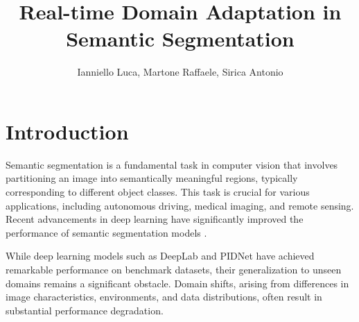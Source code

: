 \documentclass[10pt,twocolumn,letterpaper]{article}
\begin{document}
\title{Real-time Domain Adaptation in Semantic Segmentation}

\author{Ianniello Luca, 
Martone Raffaele,
Sirica Antonio\\}




\section{Introduction}
\label{sec:intro}

Semantic segmentation is a fundamental task in computer vision that involves partitioning an image into semantically meaningful regions, typically corresponding to different object classes. This task is crucial for various applications, including autonomous driving, medical imaging, and remote sensing. Recent advancements in deep learning have significantly improved the performance of semantic segmentation models \cite{hao2020brief}. 

While deep learning models such as DeepLab \cite{chen2017deeplab} and PIDNet \cite{feng2021pidnet} have achieved remarkable performance on benchmark datasets, their generalization to unseen domains remains a significant obstacle. Domain shifts, arising from differences in image characteristics, environments, and data distributions, often result in substantial performance degradation.
\end{document}
